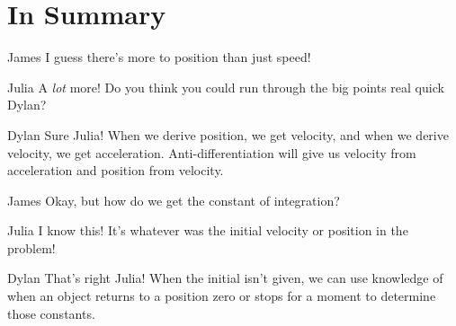 \documentclass{ximera}
\begin{document}
\section{In Summary}
\begin{dialogue}
\item[James] I guess there's more to position than just speed!
\item[Julia] A \textit{lot} more! Do you think you could run through the big points real quick Dylan?
\item[Dylan] Sure Julia! When we derive position, we get velocity, and when we derive velocity, we get acceleration. Anti-differentiation will give us velocity from acceleration and position from velocity.
\item[James] Okay, but how do we get the constant of integration?
\item[Julia] I know this! It's whatever was the initial velocity or position in the problem!
\item[Dylan] That's right Julia! When the initial isn't given, we can use knowledge of when an object returns to a position zero or stops for a moment to determine those constants.
\end{dialogue}
\end{document}
